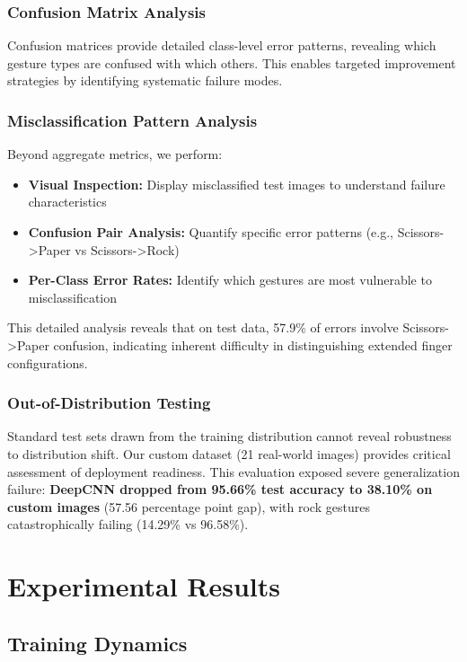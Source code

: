 \documentclass[12pt,a4paper]{article}
\begin{document}
\subsubsection{Confusion Matrix Analysis}

Confusion matrices provide detailed class-level error patterns, revealing which gesture types are confused with which others. This enables targeted improvement strategies by identifying systematic failure modes.

\subsubsection{Misclassification Pattern Analysis}

Beyond aggregate metrics, we perform:
\begin{itemize}
    \item \textbf{Visual Inspection:} Display misclassified test images to understand failure characteristics
    \item \textbf{Confusion Pair Analysis:} Quantify specific error patterns (e.g., Scissors->Paper vs Scissors->Rock)
    \item \textbf{Per-Class Error Rates:} Identify which gestures are most vulnerable to misclassification
\end{itemize}

This detailed analysis reveals that on test data, 57.9\% of errors involve Scissors->Paper confusion, indicating inherent difficulty in distinguishing extended finger configurations.

\subsubsection{Out-of-Distribution Testing}

Standard test sets drawn from the training distribution cannot reveal robustness to distribution shift. Our custom dataset (21 real-world images) provides critical assessment of deployment readiness. This evaluation exposed severe generalization failure: \textbf{DeepCNN dropped from 95.66\% test accuracy to 38.10\% on custom images} (57.56 percentage point gap), with rock gestures catastrophically failing (14.29\% vs 96.58\%).

\section{Experimental Results}

\subsection{Training Dynamics}
\end{document}
